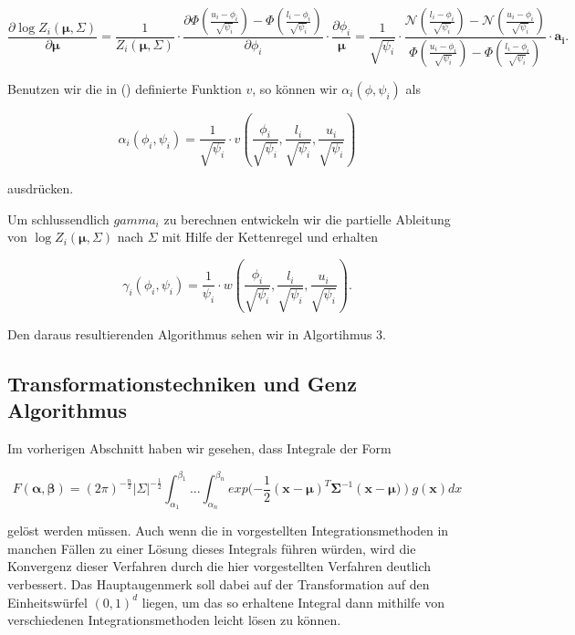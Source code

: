 \documentclass[12pt,a4paper]{scrartcl}
\numberwithin{equation}{section}
\begin{document}
\begin{equation}
 \frac{\partial \log Z_i(\mathbf{\mu, \varSigma})}{\partial \mathbf{\mu}} = \frac{1}{Z_i(\mathbf{\mu, \varSigma})} \cdot \frac{\partial \Phi(\frac{u_i - \phi_i}{\sqrt{\psi_i}}) - \Phi(\frac{l_i - \phi_i}{\sqrt{\psi_i}})}{\partial \phi_i} \cdot \frac{\partial \phi_i}{\mathbf{\mu}} = \frac{1}{\sqrt{\psi_i}} \cdot \frac{\mathcal{N}(\frac{l_i - \phi_i}{\sqrt{\psi_i}}) - \mathcal{N}(\frac{u_i - \phi_i}{\sqrt{\psi_i}})}{\Phi(\frac{u_i - \phi_i}{\sqrt{\psi_i}}) - \Phi(\frac{l_i - \phi_i}{\sqrt{\psi_i}})} \cdot \mathbf{a_i}.
\end{equation}

Benutzen wir die in () definierte Funktion $v$, so können wir $\alpha_i(\phi, \psi_i)$ als

\begin{equation}
 \alpha_i(\phi_i, \psi_i) = \frac{1}{\sqrt{\psi_i}} \cdot v \left ( \frac{\phi_i}{\sqrt{\psi_i}}, \frac{l_i}{\sqrt{\psi_i}},\frac{u_i}{\sqrt{\psi_i}} \right )
\end{equation}

ausdrücken. 

Um schlussendlich $gamma_i$ zu berechnen entwickeln wir die partielle Ableitung von $\log{Z_i(\mathbf{\mu, \varSigma})}$ nach $\mathbf{\varSigma}$ mit Hilfe der Kettenregel
und erhalten

\begin{equation}
 \gamma_i(\phi_i, \psi_i) = \frac{1}{\psi_i} \cdot w \left ( \frac{\phi_i}{\sqrt{\psi_i}}, \frac{l_i}{\sqrt{\psi_i}},\frac{u_i}{\sqrt{\psi_i}} \right ).
\end{equation}

Den daraus resultierenden Algorithmus sehen wir in Algortihmus 3. 

\subsection{Transformationstechniken und Genz Algorithmus}
Im vorherigen Abschnitt haben wir gesehen, dass Integrale der Form

\begin{equation}
 F(\mathbf{\alpha},\mathbf{\beta}) = (2\pi)^{-\frac{n}{2}} |\Sigma|^{-\frac{1}{2}} \int_{\alpha_1}^{\beta_1} ... \int_{\alpha_n}^{\beta_n} exp(-\frac{1}{2}(\mathbf{x}-\mathbf{\mu})^T \mathbf{\Sigma}^{-1}(\mathbf{x}-\mathbf{\mu)}) g(\mathbf{x}) dx
\end{equation}

gelöst werden müssen. 
Auch wenn die in vorgestellten Integrationsmethoden in manchen Fällen zu einer Lösung dieses Integrals führen würden, wird die Konvergenz dieser Verfahren durch die hier vorgestellten
Verfahren deutlich verbessert. Das Hauptaugenmerk soll dabei auf der Transformation auf den Einheitswürfel $(0,1)^d$ liegen, um das so erhaltene Integral dann mithilfe von verschiedenen
Integrationsmethoden leicht lösen zu können. 
\end{document}
